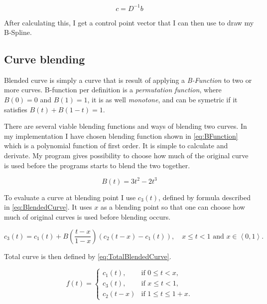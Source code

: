 \documentclass[a4paper,12pt]{extarticle}
\begin{document}
\begin{equation}
c=D^{-1}b
\end{equation}

After calculating this, I get a control point vector that I can then use to draw my B-Spline.

\subsection{Curve blending}
Blended curve is simply a curve that is result of applying a \emph{B-Function} to two or more curves. B-function per definition is a \emph{permutation function}, where $B(0)=0$ and $B(1)=1$, it is as well \emph{monotone}, and can be symetric if it satisfies $B(t)+B(1-t)=1$. \citep[Chap 6.1]{Laksa2012}

There are several viable blending functions and ways of blending two curves. In my implementation I have chosen blending function shown in \cref{eq:BFunction} which is a polynomial function of first order. It is simple to calculate and derivate. My program gives possibility to choose how much of the original curve is used before the programs starts to blend the two together. \citep[Chap 6.2.2]{Laksa2012}

\begin{equation}
B(t)= 3t^2 - 2t^3
\label{eq:BFunction}
\end{equation}

To evaluate a curve at blending point I use $c_3(t)$, defined by formula described in \cref{eq:BlendedCurve}. It uses $x$ as a blending point so that one can choose how much of original curves is used before blending occurs.

\begin{equation}
c_3(t)= c_1(t) + B\left( \frac{t-x}{1-x} \right) (c_2(t-x) - c_1(t)), \quad x \leq t < 1 \text{ and } x \in \left\langle 0,1 \right\rangle.
\label{eq:BlendedCurve}
\end{equation}

Total curve is then defined by \cref{eq:TotalBlendedCurve}.

\begin{equation}
f(t) =
\begin{cases}
c_1(t), & \text{if }0 \leq t < x,\\
c_3(t), & \text{if } x \leq t < 1,\\
c_2(t-x) & \text{if }1 \leq t \leq 1 + x.
\end{cases}
\label{eq:TotalBlendedCurve}
\end{equation}
\end{document}
